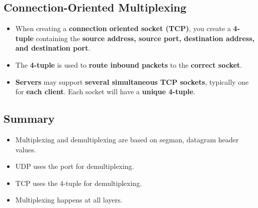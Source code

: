 \documentclass{article}
\begin{document}
    \subsection*{Connection-Oriented Multiplexing}
    \begin{itemize}
        \item When creating a \textbf{connection oriented socket (TCP)}, you create a \textbf{4-tuple} containing the \textbf{source address, source port, destination address, and destination port}.
        \item The \textbf{4-tuple} is used to \textbf{route inbound packets} to the \textbf{correct socket}.
        \item \textbf{Servers} may support \textbf{several simultaneous TCP sockets}, typically one for \textbf{each client}. Each socket will have a \textbf{unique 4-tuple}.
    \end{itemize}

    \subsection*{Summary}
    \begin{itemize}
        \item Multiplexing and demultiplexing are based on segman, datagram header values.
        \item UDP uses the port for demultiplexing.
        \item TCP uses the 4-tuple for demultiplexing.
        \item Multiplexing happens at all layers.
    \end{itemize}
    
    \section*{}
\end{document}

